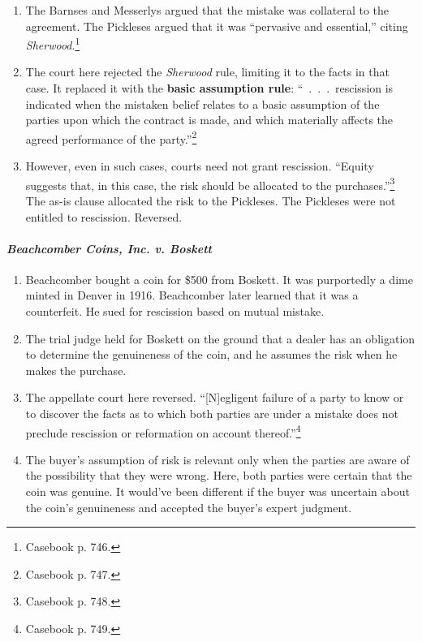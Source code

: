 \begin{enumerate}
    \item The Barnses and Messerlys argued that the mistake was collateral to 
    the agreement. The Pickleses argued that it was ``pervasive and 
    essential,'' citing \emph{Sherwood}.\footnote{Casebook p. 746.}
    \item The court here rejected the \emph{Sherwood} rule, limiting it to the 
    facts in that case. It replaced it with the \textbf{basic assumption 
    rule}: ``~.~.~.~rescission is indicated when the mistaken belief relates 
    to a basic assumption of the parties upon which the contract is made, and 
    which materially affects the agreed performance of the 
    party.''\footnote{Casebook p. 747.}
    \item However, even in such cases, courts need not grant rescission.  
    ``Equity suggests that, in this case, the risk should be allocated to the 
    purchases.''\footnote{Casebook p. 748.} The as-is clause allocated the 
    risk to the Pickleses. The Pickleses were not entitled to rescission.  
    Reversed.
\end{enumerate}

\paragraph{\emph{Beachcomber Coins, Inc. v. Boskett}}

\begin{enumerate}
    \item Beachcomber bought a coin for \$500 from Boskett. It was purportedly 
    a dime minted in Denver in 1916. Beachcomber later learned that it was a 
    counterfeit. He sued for rescission based on mutual mistake.
    \item The trial judge held for Boskett on the ground that a dealer has an 
    obligation to determine the genuineness of the coin, and he assumes the 
    risk when he makes the purchase.
    \item The appellate court here reversed. ``[N]egligent failure of a party 
    to know or to discover the facts as to which both parties are under a 
    mistake does not preclude rescission or reformation on account 
    thereof.''\footnote{Casebook p. 749.}
    \item The buyer's assumption of risk is relevant only when the parties are 
    aware of the possibility that they were wrong. Here, both parties were 
    certain that the coin was genuine. It would've been different if the buyer 
    was uncertain about the coin's genuineness and accepted the buyer's expert 
    judgment.
\end{enumerate}

